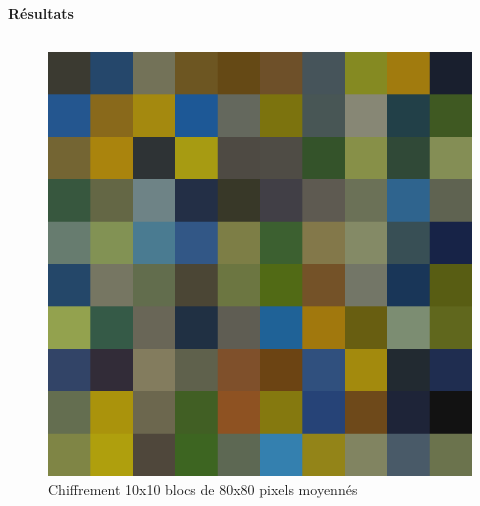 \documentclass{beamer}
\begin{document}
\begin{frame}[t]
\begin{columns}[t]
\begin{column}{.5\linewidth}
\begin{block}{\centering \textbf{Résultats}}
                    \begin{columns}[t]
                        \begin{column}{.25\linewidth}
                            \begin{figure}[t]
                                \includegraphics[width=\linewidth]{rsc/van_gogh_a_10_12.png}\\
                                {\small Chiffrement 10x10 blocs de 80x80 pixels moyennés}
                            \end{figure}
                        \end{column}


\end{columns}
\end{block}
\end{column}
\end{columns}
\end{frame}
\end{document}
